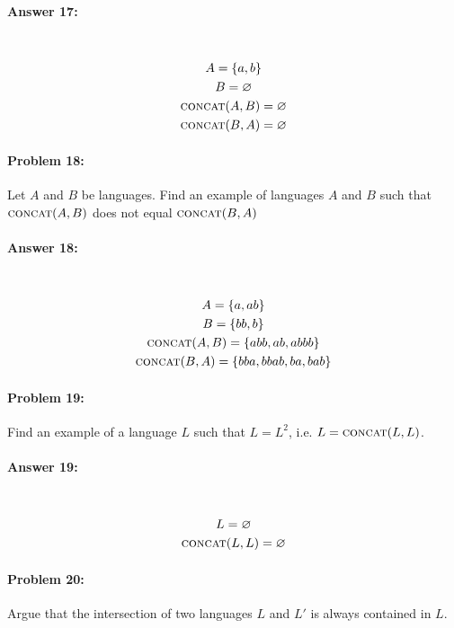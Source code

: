 \documentclass[12pt, letterpaper]{article}
\begin{document}
\paragraph{Answer 17:} ~\begin{gather*}
    A = \{a, b\}\\
    B = \varnothing\\
    \textsc{concat}(A,B) = \varnothing\\
    \textsc{concat}(B,A) = \varnothing
\end{gather*}

\hrulefill
\paragraph{Problem 18:}
Let $A$ and $B$ be languages. Find an example of languages $A$ and $B$
such that $\textsc{concat}(A,B)$ does not equal $\textsc{concat}(B,A)$

\paragraph{Answer 18:}~\begin{gather*}
    A = \{a, ab\}\\
    B = \{bb, b\}\\
    \textsc{concat}(A,B) = \{abb, ab, abbb\}\\
    \textsc{concat}(B,A) = \{bba, bbab, ba, bab\}
\end{gather*}

\hrulefill
\paragraph{Problem 19:}
Find an example of a language $L$ such that $L=L^2$,
i.e. $L=\textsc{concat}(L,L)$.

\paragraph{Answer 19:} ~\begin{gather*}
    L = \varnothing\\
    \textsc{concat}(L,L) = \varnothing
\end{gather*}

\hrulefill
\paragraph{Problem 20:}
Argue that the intersection of two languages $L$ and $L'$ is always
contained in $L$.
\end{document}
